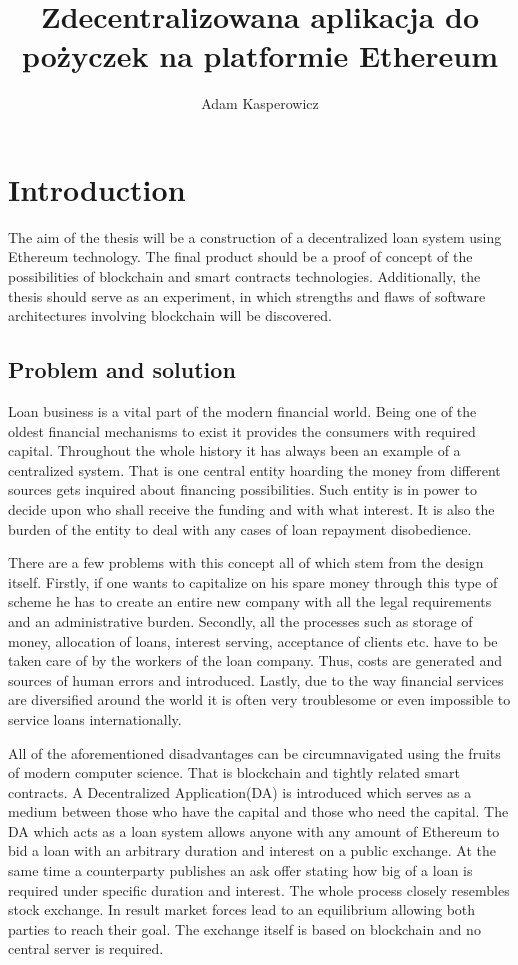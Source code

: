 \documentclass[a4paper,12pt,twoside,openany]{report}
\title{Zdecentralizowana aplikacja do pożyczek na platformie Ethereum}
\author{Adam Kasperowicz}
\begin{document}
\maketitle

\chapter{Introduction}
The aim of the thesis will be a construction of a decentralized loan system using Ethereum
technology. The final product should be a proof of concept of the possibilities of blockchain and smart contracts technologies. Additionally, the thesis should serve as an experiment, in which strengths and flaws of software architectures involving blockchain will be discovered.
 
\section{Problem and solution}
Loan business is a vital part of the modern financial world. Being one of the oldest financial mechanisms to exist it provides the consumers with required capital. Throughout the whole history it has always been an example of a centralized system. That is one central entity hoarding the money from different sources gets inquired about financing possibilities. Such entity is in power to decide upon who shall receive the funding and with what interest. It is also the burden of the entity to deal with any cases of loan repayment disobedience.

There are a few problems with this concept all of which stem from the design itself. Firstly, if one wants to capitalize on his spare money through this type of scheme he has to create an entire new company with all the legal requirements and an administrative burden. Secondly, all the processes such as storage of money, allocation of loans, interest serving, acceptance of clients etc. have to be taken care of by the workers of the loan company. Thus, costs are generated and sources of human errors and introduced. Lastly, due to the way financial services are diversified around the world it is often very troublesome or even impossible to service loans internationally.

All of the aforementioned disadvantages can be circumnavigated using the fruits of modern computer science. That is blockchain and tightly related smart contracts. A Decentralized Application(DA) is introduced which serves as a medium between those who have the capital and those who need the capital. The DA which acts as a loan system allows anyone with any amount of Ethereum to bid a loan with an arbitrary duration and interest on a public exchange. At the same time a counterparty publishes an ask offer stating how big of a loan is required under specific duration and interest. The whole process closely resembles stock exchange. In result market forces lead to an equilibrium allowing both parties to reach their goal. The exchange itself is based on blockchain and no central server is required.
\end{document}
